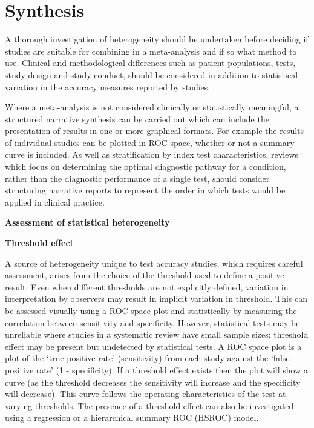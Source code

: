 \documentclass[
  11pt,
  a4paper,
  DIV=11,
  numbers=noendperiod]{scrreprt}
\begin{document}
\section{Synthesis}\label{synthesis-2}

A thorough investigation of heterogeneity should be undertaken before
deciding if studies are suitable for combining in a meta-analysis and if
so what method to use. Clinical and methodological differences such as
patient populations, tests, study design and study conduct, should be
considered in addition to statistical variation in the accuracy measures
reported by studies.

Where a meta-analysis is not considered clinically or statistically
meaningful, a structured narrative synthesis can be carried out which
can include the presentation of results in one or more graphical
formats. For example the results of individual studies can be plotted in
ROC space, whether or not a summary curve is included. As well as
stratification by index test characteristics, reviews which focus on
determining the optimal diagnostic pathway for a condition, rather than
the diagnostic performance of a single test, should consider structuring
narrative reports to represent the order in which tests would be applied
in clinical practice.

\textbf{Assessment of statistical heterogeneity}

\textbf{Threshold effect}

A source of heterogeneity unique to test accuracy studies, which
requires careful assessment, arises from the choice of the threshold
used to define a positive result. Even when different thresholds are not
explicitly defined, variation in interpretation by observers may result
in implicit variation in threshold. This can be assessed visually using
a ROC space plot and statistically by measuring the correlation between
sensitivity and specificity. However, statistical tests may be
unreliable where studies in a systematic review have small sample sizes;
threshold effect may be present but undetected by statistical tests. A
ROC space plot is a plot of the `true positive rate' (sensitivity) from
each study against the `false positive rate' (1 - specificity). If a
threshold effect exists then the plot will show a curve (as the
threshold decreases the sensitivity will increase and the specificity
will decrease). This curve follows the operating characteristics of the
test at varying thresholds. The presence of a threshold effect can also
be investigated using a regression or a hierarchical summary ROC (HSROC)
model.
\end{document}
